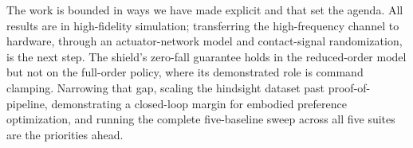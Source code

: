 \documentclass[conference]{IEEEtran}
\begin{document}
The work is bounded in ways we have made explicit and that set the agenda. All
results are in high-fidelity simulation; transferring the high-frequency channel to
hardware, through an actuator-network model and contact-signal randomization, is the
next step. The shield's zero-fall guarantee holds in the reduced-order model but not
on the full-order policy, where its demonstrated role is command clamping. Narrowing
that gap, scaling the hindsight dataset past proof-of-pipeline, demonstrating a
closed-loop margin for embodied preference optimization, and running the complete
five-baseline sweep across all five suites are the priorities ahead.



\end{document}
